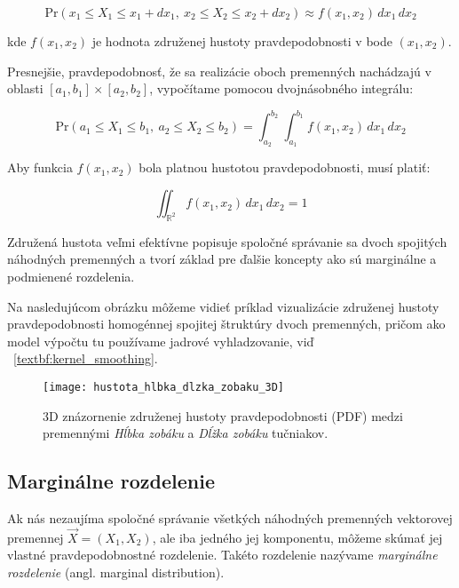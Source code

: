 \begin{equation}
\mathrm{Pr}(x_1 \leq X_1 \leq x_1 + dx_1,\ x_2 \leq X_2 \leq x_2 + dx_2) \approx f(x_1, x_2) \, dx_1 \, dx_2
\end{equation}

kde $f(x_1, x_2)$ je hodnota združenej hustoty pravdepodobnosti v bode $(x_1, x_2)$.

Presnejšie, pravdepodobnosť, že sa realizácie oboch premenných nachádzajú v oblasti $[a_1, b_1] \times [a_2, b_2]$, vypočítame pomocou dvojnásobného integrálu:

\begin{equation}
\mathrm{Pr}(a_1 \leq X_1 \leq b_1,\ a_2 \leq X_2 \leq b_2) = \int_{a_2}^{b_2} \int_{a_1}^{b_1} f(x_1, x_2) \, dx_1 \, dx_2
\end{equation}

Aby funkcia $f(x_1, x_2)$ bola platnou hustotou pravdepodobnosti, musí platiť:

\begin{equation}
\iint_{\mathbb{R}^2} f(x_1, x_2) \, dx_1 \, dx_2 = 1
\end{equation}

Združená hustota veľmi efektívne popisuje spoločné správanie sa dvoch spojitých náhodných premenných a tvorí základ pre ďalšie koncepty ako sú marginálne a podmienené rozdelenia.

Na nasledujúcom obrázku môžeme vidieť príklad vizualizácie združenej hustoty pravdepodobnosti homogénnej spojitej štruktúry dvoch premenných, pričom ako model výpočtu tu používame jadrové vyhladzovanie, viď ~\ref{textbf:kernel_smoothing}.

\begin{figure}[htpb]
    \centering
    \texttt{[image: hustota\_hlbka\_dlzka\_zobaku\_3D]}
    \caption{3D znázornenie združenej hustoty pravdepodobnosti (PDF) medzi premennými \textit{Hĺbka zobáku} a \textit{Dĺžka zobáku} tučniakov.}
    \label{fig:zobak_joint_density}
\end{figure}

\subsection{Marginálne rozdelenie}\label{subsec:marginal_dist}

Ak nás nezaujíma spoločné správanie všetkých náhodných premenných vektorovej premennej $\vec{X} = (X_1, X_2)$, ale iba jedného jej komponentu, môžeme skúmať jej vlastné pravdepodobnostné rozdelenie. Takéto rozdelenie nazývame \textit{marginálne rozdelenie} (angl. marginal distribution).

